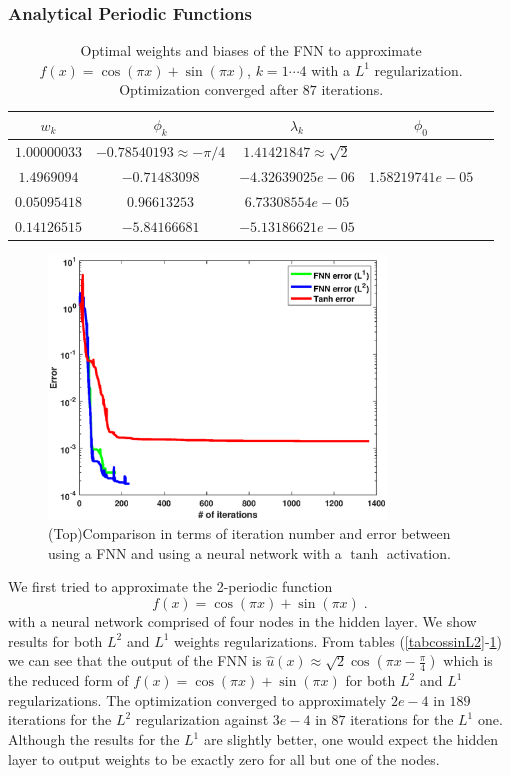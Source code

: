 \documentclass[AMS,STIX1COL]{WileyNJD-v2}
\begin{document}
\subsubsection{Analytical Periodic Functions}
 \begin{table}[!h]
  \begin{center}
\begin{tabular}{ |c|c|c|c|c| } 
\hline
$w_k$ & $\phi_k$ & $\lambda_k$& $\phi_0$ \\
\hline
$1.00000033$ & $-0.78540193 \approx -\pi/4$ &$1.41421847 \approx \sqrt{2}$& \\ 
$1.4969094$&$-0.71483098$ & $-4.32639025e-06$& $1.58219741e-05$ \\ 
$0.05095418$& $ 0.96613253$ & $6.73308554e-05$& \\ 
$0.14126515$& $-5.84166681 $ & $-5.13186621e-05$& \\ 
\hline
\end{tabular}
\caption{Optimal weights and biases of the FNN to approximate $ f(x) = \cos(\pi x) + \sin(\pi x)$, $k = 1\cdots4$ with a $L^1$ regularization. Optimization converged after $87$ iterations.}\label{tabcossinL1}
\end{center}
\end{table}

 \begin{figure}[!htb]
    \centering
    \includegraphics[width=0.8\textwidth]{itertanhvsfnn.eps}
    \caption{(Top)Comparison in terms of iteration number and error between using a FNN and using a neural network with a $\tanh$ activation.}
    \label{fig:fourvsNN_iter}
\end{figure}
We first tried to approximate the 2-periodic function 
 $$
 f(x) = \cos(\pi x) + \sin(\pi x)\;.
 $$
 with a neural network comprised of four nodes in the hidden layer. We show results for both $L^2$ and $L^1$ weights regularizations.
From tables (\ref{tabcossinL2}-\ref{tabcossinL1}) we can see that the output of the FNN is $\hat{u}(x) \approx \sqrt{2}\cos(\pi x - \frac{\pi}{4})$ which is the reduced form of  $f(x)= \cos(\pi x) + \sin(\pi x)$ for both $L^2$ and $L^1$ regularizations. The optimization converged to approximately $2e-4$ in $189$ iterations for the $L^2$ regularization against $3e-4$ in $87$ iterations for the $L^1$ one. Although the results for the $L^1$ are slightly better, one would expect the hidden layer to output weights to be exactly zero for all but one of the nodes.
\end{document}
